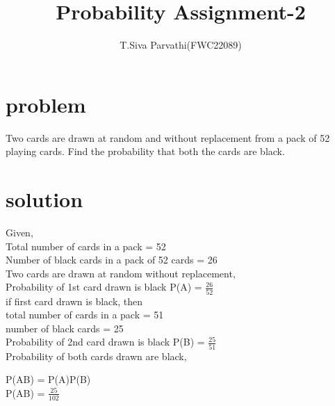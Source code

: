 \documentclass[journal,12pt,twocolumn]{IEEEtran}
\title{\mytitle}
\title{
Probability Assignment-2
}
\author{T.Siva Parvathi(FWC22089)}
\begin{document}
\maketitle
\tableofcontents
\bigskip


\section{\textbf{problem}}
Two cards are drawn at random and without replacement from a pack of 52 playing cards. Find the probability that both the cards are black.
\section{\textbf{solution}}
Given,\\ Total number of cards in a pack = 52\\
Number of black cards in a pack of 52 cards = 26\\
Two cards are drawn at random without replacement,\\

Probability of 1st card drawn is black P(A) = $\frac{26}{52}$\\

if first card drawn is black, then\\
total number of cards in a pack = 51 \\
number of black cards = 25 \\

Probability of 2nd card drawn is black P(B) = $\frac{25}{51}$\\

Probability of both cards drawn are black,
\begin{center}
P(AB) = P(A)P(B)\\ 
P(AB) = $\frac{25}{102}$
\end{center}
\end{document}
